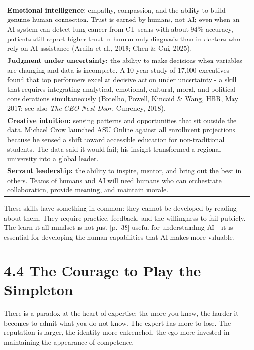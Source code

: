 \documentclass[
  letterpaper,
  DIV=11,
  numbers=noendperiod]{scrreprt}
\newcounter{none} %
\begin{document}
{\def\LTcaptype{none} %
\begin{longtable}[]{@{}
  >{\raggedright\arraybackslash}p{}@{}}
\toprule\noalign{}
\endhead
\bottomrule\noalign{}
\endlastfoot
\textbf{Emotional intelligence:} empathy, compassion, and the ability to
build genuine human connection. Trust is earned by humans, not AI; even
when an AI system can detect lung cancer from CT scans with about 94\%
accuracy, patients still report higher trust in human-only diagnosis
than in doctors who rely on AI assistance (Ardila et al., 2019; Chen \&
Cui, 2025). \\
\textbf{Judgment under uncertainty:} the ability to make decisions when
variables are changing and data is incomplete. A 10-year study of 17,000
executives found that top performers excel at decisive action under
uncertainty - a skill that requires integrating analytical, emotional,
cultural, moral, and political considerations simultaneously (Botelho,
Powell, Kincaid \& Wang, HBR, May 2017; see also \emph{The CEO Next
Door}, Currency, 2018). \\
\textbf{Creative intuition:} sensing patterns and opportunities that sit
outside the data. Michael Crow launched ASU Online against all
enrollment projections because he sensed a shift toward accessible
education for non-traditional students. The data said it would fail; his
insight transformed a regional university into a global leader. \\
\textbf{Servant leadership:} the ability to inspire, mentor, and bring
out the best in others. Teams of humans and AI will need humans who can
orchestrate collaboration, provide meaning, and maintain morale. \\
\end{longtable}
}

These skills have something in common: they cannot be developed by
reading about them. They require practice, feedback, and the willingness
to fail publicly. The learn-it-all mindset is not just {[}p.~38{]}
useful for understanding AI - it is essential for developing the human
capabilities that AI makes more valuable.

\section{4.4 The Courage to Play the
Simpleton}\label{the-courage-to-play-the-simpleton}

There is a paradox at the heart of expertise: the more you know, the
harder it becomes to admit what you do not know. The expert has more to
lose. The reputation is larger, the identity more entrenched, the ego
more invested in maintaining the appearance of competence.
\end{document}
